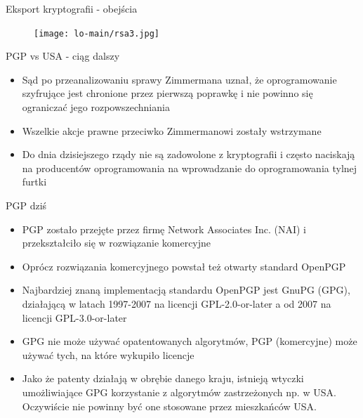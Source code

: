 \documentclass[aspectratio=169]{beamer}
\begin{document}
\begin{frame}{Eksport kryptografii - obejścia}
    \begin{figure}
        \centering
        \texttt{[image: lo-main/rsa3.jpg]}
    \end{figure}
\end{frame}

\begin{frame}{PGP vs USA - ciąg dalszy}
    \begin{itemize}
        \item Sąd po przeanalizowaniu sprawy Zimmermana uznał, że oprogramowanie szyfrujące jest chronione przez pierwszą poprawkę i nie powinno się ograniczać jego rozpowszechniania
        \item Wszelkie akcje prawne przeciwko Zimmermanowi zostały wstrzymane
        \item Do dnia dzisiejszego rządy nie są zadowolone z kryptografii i często naciskają na producentów oprogramowania na wprowadzanie do oprogramowania tylnej furtki
    \end{itemize}
\end{frame}

\begin{frame}{PGP dziś}
    \begin{itemize}
        \item PGP zostało przejęte przez firmę Network Associates Inc. (NAI) i przekształciło się w rozwiązanie komercyjne
        \item Oprócz rozwiązania komercyjnego powstał też otwarty standard OpenPGP
        \item Najbardziej znaną implementacją standardu OpenPGP jest GnuPG (GPG), działającą w latach 1997-2007 na licencji GPL-2.0-or-later a od 2007 na licencji GPL-3.0-or-later
        \item GPG nie może używać opatentowanych algorytmów, PGP (komercyjne) może używać tych, na które wykupiło licencje
        \item Jako że patenty działają w obrębie danego kraju, istnieją wtyczki umożliwiające GPG korzystanie z algorytmów zastrzeżonych np. w USA. Oczywiście nie powinny być one stosowane przez mieszkańców USA.
    \end{itemize}
\end{frame}
\end{document}
